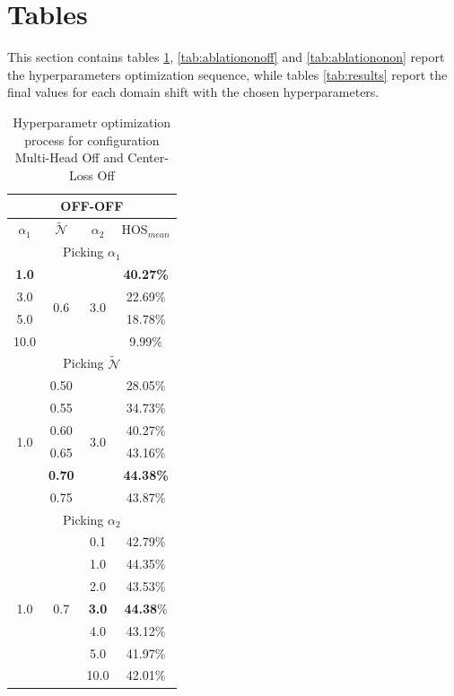 \documentclass[10pt,twocolumn,letterpaper]{article}
\begin{document}
{\small
\nocite{BucciROS}


}

\appendix
\section{Tables}
\label{sec:tables}

This section contains tables \ref{tab:ablationoffoff}, \ref{tab:ablationonoff} and \ref{tab:ablationonon} report the hyperparameters optimization sequence, while tables \ref{tab:results} report the final values for each domain shift with the chosen hyperparameters.

\begin{table}[h!]
  \centering
  \begin{tabular}[h]{||c|c|c||c||}
    \hline
    \multicolumn{4}{||c||}{OFF-OFF} \\
    \hline
    $\alpha_1$ & $\mathcal{\tilde N}$ & $\alpha_2$ & HOS$_{mean}$\\    
    \hline
    \hline
    \multicolumn{4}{||c||}{Picking $\alpha_1$} \\
    \hline
    {\bf 1.0}  & \multirow{4}{*}{0.6} & \multirow{4}{*}{3.0} & {\bf 40.27\%} \\
    3.0  & & & 22.69\% \\
    5.0  & & & 18.78\% \\
    10.0 & & & 9.99\% \\
    \hline
    \hline
    \multicolumn{4}{||c||}{Picking $\mathcal{\tilde N}$} \\
    \hline
    \multirow{6}{*}{1.0} & 0.50 & \multirow{6}{*}{3.0}  & 28.05\%\\
    & 0.55 & & 34.73\% \\
    & 0.60 & & 40.27\% \\
    & 0.65 & & 43.16\% \\
    & {\bf 0.70} & & {\bf 44.38\%} \\
    & 0.75 & & 43.87\% \\
    \hline
    \hline
    \multicolumn{4}{||c||}{Picking $\alpha_2$} \\
    \hline
    \multirow{7}{*}{1.0} & \multirow{7}{*}{0.7} & 0.1 & 42.79\%\\
    && 1.0 & 44.35\% \\
    && 2.0 & 43.53\% \\
    && {\bf 3.0} & {\bf 44.38}\% \\
    && 4.0 & 43.12\% \\
    && 5.0 & 41.97\% \\
    && 10.0 & 42.01\% \\
    \hline
  \end{tabular}
  \caption{\centering\label{tab:ablationoffoff} Hyperparametr optimization process for configuration Multi-Head Off and Center-Loss Off}
\end{table}
\end{document}

